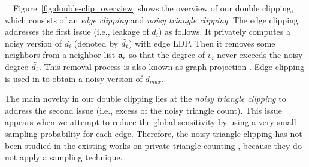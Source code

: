 \smallskip
{}~~Figure~\ref{fig:double-clip_overview} shows 
the overview of our double clipping, which consists of an 
\textit{edge clipping} 
and \textit{noisy triangle clipping}. 
The edge clipping 
addresses the first issue (i.e., leakage of $d_i$) 
as follows. 
It privately computes 
a noisy version of 
$d_i$ (denoted by $\tilde{d}_i$) with edge LDP. 
Then it 
removes some neighbors from a neighbor list $\mathbf{a}_i$ so that the degree of $v_i$ never exceeds 
the noisy degree $\tilde{d}_i$. 
This removal process is also known as graph projection \cite{Day_SIGMOD16,Ding_TKDE21,Kasiviswanathan_TCC13,Raskhodnikova_arXiv15}. 
Edge clipping 
is 
used in \cite{Imola_USENIX21} to obtain a 
noisy version of 
$d_{max}$. 

The main novelty in our double clipping lies at the \textit{noisy triangle clipping} to address the second issue (i.e., excess of the noisy triangle count). 
This issue appears 
when 
we attempt to reduce the global sensitivity by using 
a very small sampling probability for each edge. 
Therefore, the noisy triangle clipping has not been studied in the existing works on private triangle counting 
\cite{Ding_TKDE21,Imola_USENIX21,Karwa_PVLDB11,Kasiviswanathan_TCC13,Sun_CCS19,Ye_ICDE20,Ye_TKDE21,Zhang_SIGMOD15}, 
because they do not apply a sampling technique. 

